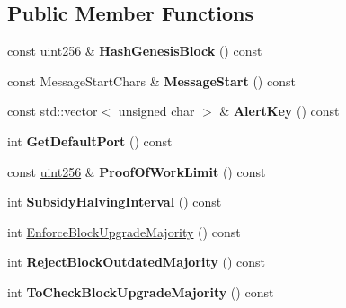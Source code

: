 \subsection*{Public Member Functions}
\begin{DoxyCompactItemize}
\item 
\mbox{\label{class_c_chain_params_a68e10a5e6ad16a5c2bfa0a8a1c8f4c4b}} 
const \mbox{\hyperlink{classuint256}{uint256}} \& {\bfseries Hash\+Genesis\+Block} () const
\item 
\mbox{\label{class_c_chain_params_accc01cc5a34b449c3370f46a5b4c5190}} 
const Message\+Start\+Chars \& {\bfseries Message\+Start} () const
\item 
\mbox{\label{class_c_chain_params_a8ca8fe289d1c3d5851d6aebaf28db22f}} 
const std\+::vector$<$ unsigned char $>$ \& {\bfseries Alert\+Key} () const
\item 
\mbox{\label{class_c_chain_params_a2e796bba356e7ce2040f545ea466754f}} 
int {\bfseries Get\+Default\+Port} () const
\item 
\mbox{\label{class_c_chain_params_af171e47287f097c8753b9581fd3c3c58}} 
const \mbox{\hyperlink{classuint256}{uint256}} \& {\bfseries Proof\+Of\+Work\+Limit} () const
\item 
\mbox{\label{class_c_chain_params_a3dc06a2a30742a9beb8953622cbaf477}} 
int {\bfseries Subsidy\+Halving\+Interval} () const
\item 
int \mbox{\hyperlink{class_c_chain_params_ac55b927a13650f1b6593b0200258ce62}{Enforce\+Block\+Upgrade\+Majority}} () const
\item 
\mbox{\label{class_c_chain_params_a759fe1926448351c9a0856b28e83e794}} 
int {\bfseries Reject\+Block\+Outdated\+Majority} () const
\item 
\mbox{\label{class_c_chain_params_a84aa3a27051e0bc1d47586c24983548c}} 
int {\bfseries To\+Check\+Block\+Upgrade\+Majority} () const
\item 
\mbox{\label{class_c_chain_params_a53d47c5358366c218fc26cacb9bd4010}} 

\end{DoxyCompactItemize}
